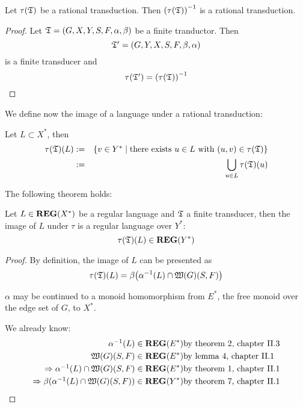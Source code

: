 \bigskip
\begin{lemma}
Let $\tau(\mbox{$\mathfrak{T}$})$ be a rational transduction. Then $\mbox{${(\tau(\mbox{$\mathfrak{T}$}))}^{-1}$}$ is a 
rational transduction.
\end{lemma}

\begin{proof}
Let $\mbox{$\mathfrak{T}$} = (G, X, Y, S, F, \alpha, \beta)$ be a finite tranductor.
Then
\[ \mbox{$\mathfrak{T'}$} = (G, Y, X, S, F, \beta, \alpha) \]
is a finite transducer and
\[ \tau(\mbox{$\mathfrak{T'}$}) = \mbox{${(\tau(\mbox{$\mathfrak{T}$}))}^{-1}$} \]
\end{proof}

We define now the image of a language under a rational transduction:

\begin{definition}
Let $L \subset X^*$, then
\begin{eqnarray*}
\tau(\mbox{$\mathfrak{T}$})(L) & := & \mbox{$\{v \in Y^* \mid \text{there exists } u \in L \text{
with } (u, v) \in \tau(\mbox{$\mathfrak{T}$})\}$} \\
& := & \bigcup_{u \in L} \tau(\mbox{$\mathfrak{T}$})(u)
\end{eqnarray*}
\end{definition}

The following theorem holds:

\begin{theorem}
Let $L \in \mbox{{\bf REG}}(X^*)$ be a regular language and $\mbox{$\mathfrak{T}$}$ a finite transducer,
then the image of $L$ under $\tau$ is a regular language over $Y^*$:
\[ \tau(\mbox{$\mathfrak{T}$})(L) \in \mbox{{\bf REG}}(Y^*) \]
\end{theorem}

\begin{proof}
By definition, the image of $L$ can be presented as
\[ \tau(\mbox{$\mathfrak{T}$})(L) = \beta\big( \alpha^{-1}(L) \cap \mbox{$\mathfrak{W}({G})$}(S, F) \big) \]

$\alpha$ may be continued to a monoid homomorphism from $E^*$, the free monoid
over the edge set of $G$, to $X^*$.

We already know:
\begin{eqnarray*}
\mbox{${\alpha}^{-1}$}(L) \in \mbox{{\bf REG}}(E^*)    & \text{by theorem 2, chapter II.3} \\
\mbox{$\mathfrak{W}({G})$}(S, F) \in \mbox{{\bf REG}}(E^*) & \text{by lemma 4, chapter II.1} \\
\Rightarrow \mbox{${\alpha}^{-1}$}(L) \cap \mbox{$\mathfrak{W}({G})$}(S, F) \in \mbox{{\bf REG}}(E^*) & \text{by
theorem 1, chapter II.1} \\
\Rightarrow \beta(\mbox{${\alpha}^{-1}$}(L) \cap \mbox{$\mathfrak{W}({G})$}(S, F)) \in \mbox{{\bf REG}}(Y^*) &
\text{by theorem 7, chapter II.1}
\end{eqnarray*}
\end{proof}

